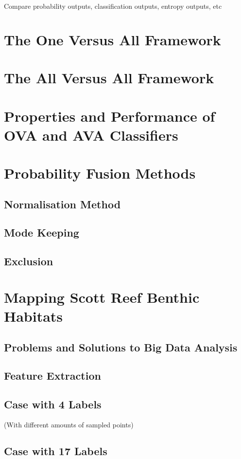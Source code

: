 		Compare probability outputs, classification outputs, entropy outputs, etc

	\section{The One Versus All Framework}
	
	\section{The All Versus All Framework}
	
	\section{Properties and Performance of OVA and AVA Classifiers}
	
	\section{Probability Fusion Methods}
	
		\subsection{Normalisation Method}
			
		\subsection{Mode Keeping}
			
		\subsection{Exclusion}
			
	\section{Mapping Scott Reef Benthic Habitats}
	
		\subsection{Problems and Solutions to Big Data Analysis}
		
		\subsection{Feature Extraction}
		
		\subsection{Case with 4 Labels}
		
			(With different amounts of sampled points)
			
		\subsection{Case with 17 Labels}
		
